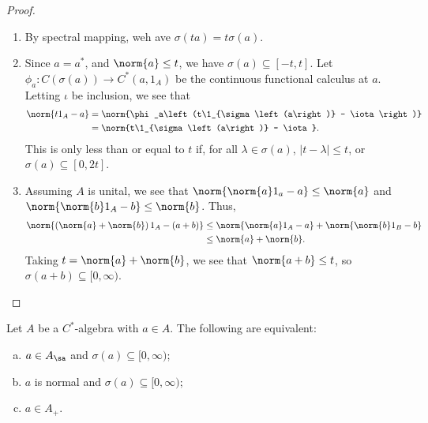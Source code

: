 \documentclass[10pt]{mypackage}
\begin{document}
\begin{proof}\hfill
  \begin{enumerate}[(1)]
    \item By spectral mapping, weh ave $\sigma\left(ta\right) = t\sigma\left(a\right)$.
    \item Since $a = a^{\ast}$, and $\norm{a} \leq t$, we have $\sigma\left(a\right)\subseteq [-t,t]$. Let $\phi_a\colon C\left(\sigma\left(a\right)\right)\rightarrow C^{\ast}\left(a,1_A\right)$ be the continuous functional calculus at $a$. Letting $\iota$ be inclusion, we see that
      \begin{align*}
        \norm{t1_A - a} &= \norm{\phi_a\left(t\1_{\sigma\left(a\right)} - \iota\right)}\\
                        &= \norm{t\1_{\sigma\left(a\right)} - \iota}.
      \end{align*}
      This is only less than or equal to $t$ if, for all $\lambda\in\sigma\left(a\right)$, $\left\vert t-\lambda \right\vert \leq t$, or $\sigma\left(a\right)\subseteq [0,2t]$.
    \item Assuming $A$ is unital, we see that $\norm{\norm{a}1_a - a}\leq \norm{a}$ and $\norm{\norm{b}1_A-b}\leq \norm{b}$. Thus,
      \begin{align*}
        \norm{\left(\norm{a} + \norm{b}\right)1_A - \left(a+b\right)} &\leq \norm{\norm{a}1_A-a} + \norm{\norm{b}1_B - b}\\
                                                                      &\leq \norm{a} + \norm{b}.
      \end{align*}
      Taking $t = \norm{a} + \norm{b}$, we see that $\norm{a+b} \leq t$, so $\sigma\left(a+b\right)\subseteq [0,\infty)$.
  \end{enumerate}
\end{proof}
\begin{theorem}
  Let $A$ be a $C^{\ast}$-algebra with $a\in A$. The following are equivalent:
  \begin{enumerate}[(a)]
    \item $a\in A_{\sa}$ and $\sigma\left(a\right)\subseteq [0,\infty)$;
    \item $a$ is normal and $\sigma\left(a\right)\subseteq [0,\infty)$;
    \item $a\in A_{+}$.
  \end{enumerate}
\end{theorem}
\end{document}
